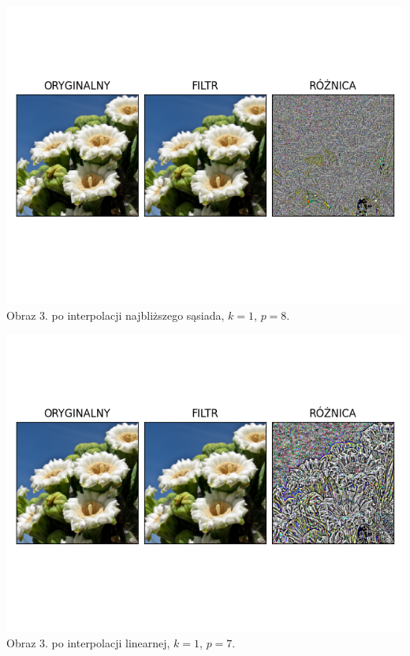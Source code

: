 \documentclass[14pt]{article}
\begin{document}
\begin{center}
    \includegraphics[scale=0.7]{images/nn_k1_p8.png}
    \\ \small Obraz 3. po interpolacji najbliższego sąsiada, 
    $k=1$, $p=8$.

    \includegraphics[scale=0.7]{images/lin_k1_p7.png}
    \\ \small Obraz 3. po interpolacji linearnej, 
    $k=1$, $p=7$.


\end{center}
\end{document}
